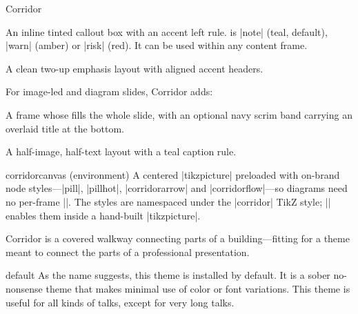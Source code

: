 \begin{themeexample}{Corridor}
  \begin{command}{\corridorcallout{}}
    An inline tinted callout box with an accent left rule.  is |note| (teal, default), |warn| (amber) or |risk| (red). It can be used within any content frame.
  \end{command}

  \begin{command}{\corridortwoup{}}
    A clean two-up emphasis layout with aligned accent headers.
  \end{command}

  For image-led and diagram slides, Corridor adds:

  \begin{command}{\corridorfullimage{}}
    A frame whose  fills the whole slide, with an optional navy scrim band carrying an overlaid title at the bottom.
  \end{command}

  \begin{command}{\corridorsplit{}}
    A half-image, half-text layout with a teal caption rule.
  \end{command}

  \begin{command}{corridorcanvas \rm(environment)}
    A centered |tikzpicture| preloaded with on-brand node styles---|pill|, |pillhot|, |corridorarrow| and |corridorflow|---so diagrams need no per-frame |\tikzset|. The styles are namespaced under the |corridor| TikZ style; |\corridortikzset| enables them inside a hand-built |tikzpicture|.
  \end{command}

  Corridor is a covered walkway connecting parts of a building---fitting for a theme meant to connect the parts of a professional presentation.
\end{themeexample}

\begin{themeexample}{default}
  As the name suggests, this theme is installed by default. It is a sober no-nonsense theme that makes minimal use of color or font variations. This theme is useful for all kinds of talks, except for very long talks.
\end{themeexample}

